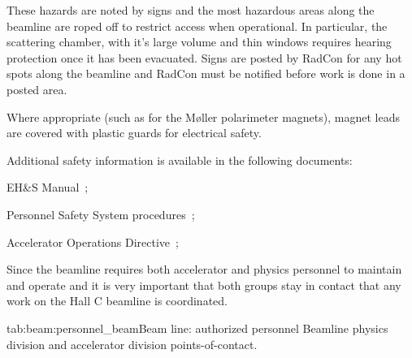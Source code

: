 \begin{safetyen}{0}{0}
These hazards are noted by signs and the most hazardous areas along
the beamline are roped off to restrict access when operational.  In
particular, the scattering chamber, with it's large volume and thin
windows requires hearing protection once it has been evacuated.  Signs
are posted by RadCon for any hot spots along the beamline and RadCon
must be notified before work is done in a posted area.

Where appropriate (such as for the M\o ller polarimeter magnets),
magnet leads are covered with plastic guards for electrical safety.

\noindent{}Additional safety information is available in the following documents:
\begin{list}{--}{\setlength{\itemsep}{-0.15cm}}
  \item EH\&S Manual~\cite{EHScebaf};
  \item Personnel Safety System procedures~\cite{PSScontrolledenter,PSScontrolledexit,PSScontrolledproc};
  \item Accelerator Operations Directive~\cite{AODcebaf};
\end{list}


Since the beamline requires both accelerator and physics personnel to
maintain and operate and it is very important that both groups stay in
contact that any work on the Hall C beamline is coordinated.

\begin{namestab}{tab:beam:personnel_beam}{Beam line: authorized personnel}{%
   Beamline physics division and accelerator division points-of-contact.}
\end{namestab}
\end{safetyen}
